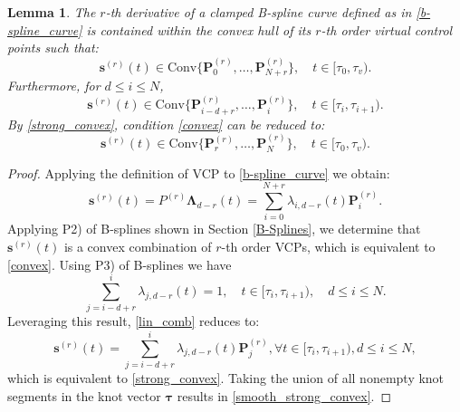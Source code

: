 \documentclass[journal,10pt]{IEEEtran}
\newtheorem{lemma}{\bfseries Lemma}%
\newcommand{\vect}[1]{\boldsymbol{\mathbf{#1}}}
\newif\ifdraft
\newcommand{\VF}[1]{\ifdraft{\color{blue}[{\bf VF}: #1]}\fi}
\begin{document}
\begin{lemma} \label{smooth_strong_convexity}
The $r$-th derivative of a clamped B-spline curve defined as in \eqref{b-spline_curve} is contained within the convex hull of its $r$-th order virtual control points such that:
\begin{equation}
    \vect{s}^{(r)}(t) \in \text{Conv}\{\vect{P}_{0}^{(r)},\dots,\vect{P}_{N+r}^{(r)}\}, \quad t\in [\tau_0,\tau_v).
    \label{convex}
\end{equation} 
Furthermore, for $d\leq i\leq N$, %
\begin{equation}        
    \vect{s}^{(r)}(t) \in \text{Conv}\{\vect{P}_{i-d+r}^{(r)},\dots,\vect{P}_{i}^{(r)}\}, \quad  t\in[\tau_i,\tau_{i+1}).
    \label{strong_convex}
\end{equation}
By \eqref{strong_convex}, condition \eqref{convex} can be reduced to:
\begin{equation}
    \vect{s}^{(r)}(t) \in \text{Conv} \{\vect{P}_{r}^{(r)},\dots,\vect{P}_N^{(r)}\}, \quad t\in[\tau_0,\tau_v).
    \label{smooth_strong_convex}
\end{equation}
\end{lemma}
\begin{proof}
Applying 
the definition of VCP to \eqref{b-spline_curve} we obtain:
\begin{equation}
    \vect{s}^{(r)}(t) = P^{(r)}\vect{\Lambda}_{d-r}(t) = \sum_{i=0}^{N+r} \lambda_{i,d-r}(t)\vect{P}^{(r)}_i.
    \label{lin_comb}
\end{equation}
Applying P2) of B-splines shown in Section \ref{B-Splines}, we determine that $\vect{s}^{(r)}(t)$ is a convex combination of $r$-th order VCPs, which is equivalent to \eqref{convex}. Using P3) of B-splines we have %
\begin{equation*}
    \sum_{j=i-d+r}^{i}\lambda_{j,d-r}(t)=1,\quad  t\in[\tau_i,\tau_{i+1}), \quad d\leq i \leq N.
\end{equation*}
Leveraging this result, \eqref{lin_comb} reduces to:
\begin{equation*}
    \vect{s}^{(r)}(t) = \sum_{j=i-d+r}^{i} \lambda_{j,d-r}(t)\vect{P}^{(r)}_j, \forall t\in [\tau_i,\tau_{i+1}), d\leq i\leq N,
\end{equation*}
which is equivalent to \eqref{strong_convex}. Taking the union of all nonempty knot segments in the knot vector $\vect{\tau}$ results in \eqref{smooth_strong_convex}. %
\end{proof}
\end{document}
